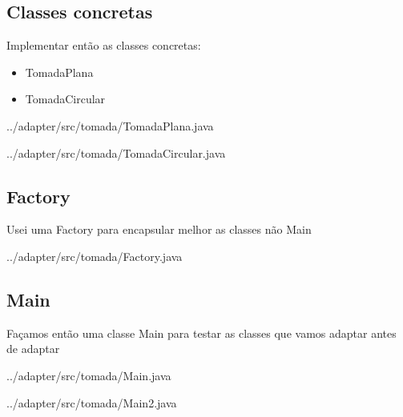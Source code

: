 \documentclass{if-beamer}
\begin{document}
\begin{frame}

	\subsection{Classes concretas}	
	\begin{exampleblock}

		Implementar então as classes concretas:
		\begin{itemize}
			\item TomadaPlana
			\item TomadaCircular
		\end{itemize}
	\end{exampleblock}

	 {../adapter/src/tomada/TomadaPlana.java}
	
	 {../adapter/src/tomada/TomadaCircular.java}

\end{frame}

\begin{frame}
	
	\subsection{Factory}
	\begin{exampleblock}

		Usei uma Factory para encapsular melhor as classes não Main
	\end{exampleblock}

	 {../adapter/src/tomada/Factory.java}

\end{frame}

\begin{frame}
	
	\subsection{Main}
	\begin{exampleblock}

		Façamos então uma classe Main para testar as classes que vamos adaptar antes de adaptar
	\end{exampleblock}

	 {../adapter/src/tomada/Main.java}


	 {../adapter/src/tomada/Main2.java}



\end{frame}
\end{document}
